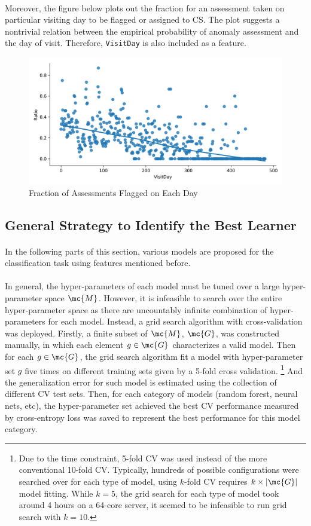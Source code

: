 \documentclass[11pt]{article}
\begin{document}
	\paragraph{} Moreover, the figure below plots out the fraction for an assessment taken on particular visiting day to be flagged or assigned to CS. The plot suggests a nontrivial relation between the empirical probability of anomaly assessment and the day of visit. Therefore, \texttt{VisitDay} is also included as a feature.
	\begin{figure}[H]
		\centering
		\includegraphics[width=0.7\linewidth]{figures/alert_ratio_days.png}
		\caption{Fraction of Assessments Flagged on Each Day}
	\end{figure}
	
	\subsection{General Strategy to Identify the Best Learner}
	\paragraph{} In the following parts of this section, various models are proposed for the classification task using features mentioned before.
	\paragraph{} In general, the hyper-parameters of each model must be tuned over a large hyper-parameter space $\mc{M}$. However, it is infeasible to search over the entire hyper-parameter space as there are uncountably infinite combination of hyper-parameters for each model. Instead, a grid search algorithm with cross-validation was deployed. Firstly, a finite subset of $\mc{M}$, $\mc{G}$, was constructed manually, in which each element $g \in \mc{G}$ characterizes a valid model. Then for each $g \in \mc{G}$, the grid search algorithm fit a model with hyper-parameter set $g$ five times on different training sets given by a 5-fold cross validation.
	\footnote{Due to the time constraint, 5-fold CV was used instead of the more conventional 10-fold CV. Typically, hundreds of possible configurations were searched over for each type of model, using $k$-fold CV requires $k \times |\mc{G}|$ model fitting. While $k=5$, the grid search for each type of model took around 4 hours on a 64-core server, it seemed to be infeasible to run grid search with $k=10$.}
	And the generalization error for such model is estimated using the collection of different CV test sets. Then, for each category of models (random forest, neural nets, etc), the hyper-parameter set  achieved the best CV performance measured by cross-entropy loss was saved to represent the best performance for this model category.
	
\end{document}
